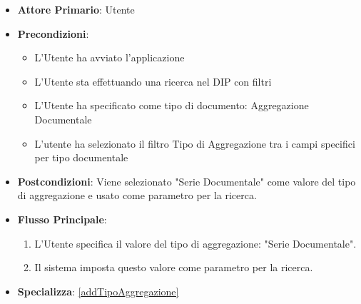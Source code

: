\begin{itemize}
      \item \textbf{Attore Primario}: Utente
      \item \textbf{Precondizioni}: 
      \begin{itemize}
            \item L'Utente ha avviato l'applicazione
            \item L'Utente sta effettuando una ricerca nel DIP con filtri
            \item L'Utente ha specificato come tipo di documento: Aggregazione Documentale
            \item L'utente ha selezionato il filtro Tipo di Aggregazione tra i campi specifici per tipo documentale
      \end{itemize}
      \item \textbf{Postcondizioni}: Viene selezionato "Serie Documentale" come valore del tipo di aggregazione e usato come parametro per la ricerca.
      \item \textbf{Flusso Principale}:
      \begin{enumerate}
            \item L'Utente specifica il valore del tipo di aggregazione: "Serie Documentale".
            \item Il sistema imposta questo valore come parametro per la ricerca.
      \end{enumerate}
      \item \textbf{Specializza}: \ref{addTipoAggregazione}
\end{itemize}

